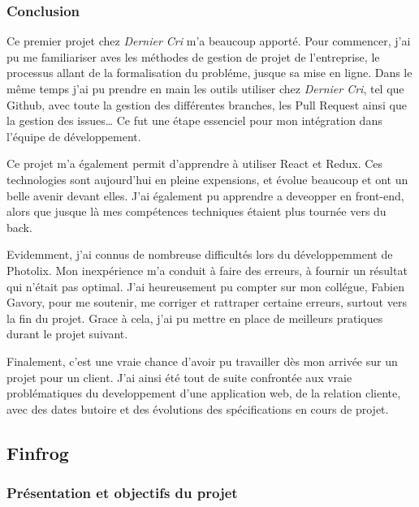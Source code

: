 \bigskip

\subsubsection{Conclusion}\label{conclusion}

\bigskip

Ce premier projet chez \emph{Dernier Cri} m'a beaucoup apporté. Pour
commencer, j'ai pu me familiariser aves les méthodes de gestion de
projet de l'entreprise, le processus allant de la formalisation du
probléme, jusque sa mise en ligne. Dans le même temps j'ai pu prendre en
main les outils utiliser chez \emph{Dernier Cri}, tel que Github, avec
toute la gestion des différentes branches, les Pull Request ainsi que la
gestion des issues\ldots{} Ce fut une étape essenciel pour mon
intégration dans l'équipe de développement.

\bigskip

Ce projet m'a également permit d'apprendre à utiliser React et Redux.
Ces technologies sont aujourd'hui en pleine expensions, et évolue
beaucoup et ont un belle avenir devant elles. J'ai également pu
apprendre a deveopper en front-end, alors que jusque là mes compétences
techniques étaient plus tournée vers du back.

\bigskip

Evidemment, j'ai connus de nombreuse difficultés lors du développemment
de Photolix. Mon inexpérience m'a conduit à faire des erreurs, à fournir
un résultat qui n'était pas optimal. J'ai heureusement pu compter sur
mon collégue, Fabien Gavory, pour me soutenir, me corriger et rattraper
certaine erreurs, surtout vers la fin du projet. Grace à cela, j'ai pu
mettre en place de meilleurs pratiques durant le projet suivant.

\bigskip

Finalement, c'est une vraie chance d'avoir pu travailler dès mon arrivée
sur un projet pour un client. J'ai ainsi été tout de suite confrontée
aux vraie problématiques du developpement d'une application web, de la
relation cliente, avec des dates butoire et des évolutions des
spécifications en cours de projet.

\subsection{Finfrog}\label{finfrog}

\subsubsection{Présentation et objectifs du
projet}\label{pruxe9sentation-et-objectifs-du-projet-1}

